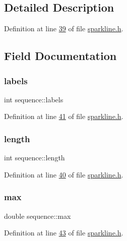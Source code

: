 \subsection{Detailed Description}


Definition at line \hyperlink{sparkline_8h_source_l00039}{39} of file \hyperlink{sparkline_8h_source}{sparkline.\+h}.



\subsection{Field Documentation}
\mbox{\label{structsequence_a41a7f8a23509c97d200f1bfeb0e80743}} 
\subsubsection{\texorpdfstring{labels}{labels}}
{\footnotesize\ttfamily int sequence\+::labels}



Definition at line \hyperlink{sparkline_8h_source_l00041}{41} of file \hyperlink{sparkline_8h_source}{sparkline.\+h}.

\mbox{\label{structsequence_ad17da18a2bb3da07590029e824e20552}} 
\subsubsection{\texorpdfstring{length}{length}}
{\footnotesize\ttfamily int sequence\+::length}



Definition at line \hyperlink{sparkline_8h_source_l00040}{40} of file \hyperlink{sparkline_8h_source}{sparkline.\+h}.

\mbox{\label{structsequence_acf286fe373173ce1ba2f779dc48a4ad4}} 
\subsubsection{\texorpdfstring{max}{max}}
{\footnotesize\ttfamily double sequence\+::max}



Definition at line \hyperlink{sparkline_8h_source_l00043}{43} of file \hyperlink{sparkline_8h_source}{sparkline.\+h}.

